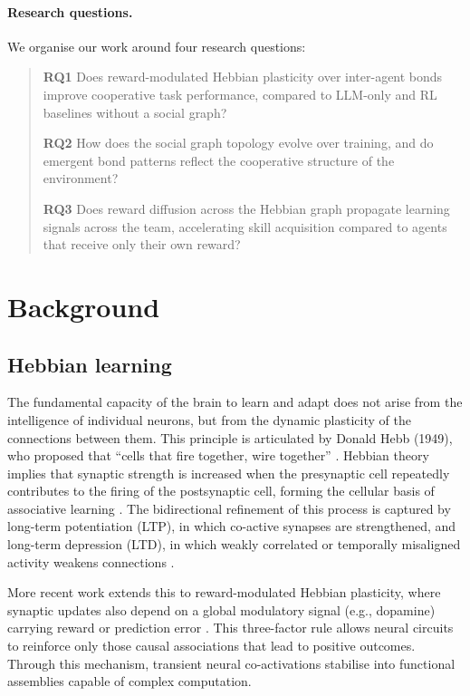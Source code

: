 \documentclass{article}
\theoremstyle{plain}
\theoremstyle{definition}
\theoremstyle{remark}
\begin{document}
\paragraph{Research questions.} We organise our work around four research questions:
\begin{quote}
\textbf{RQ1} Does reward-modulated Hebbian plasticity over inter-agent bonds improve cooperative task performance, compared to LLM-only and RL baselines without a social graph?

\textbf{RQ2} How does the social graph topology evolve over training, and do emergent bond patterns reflect the cooperative structure of the environment?

\textbf{RQ3} Does reward diffusion across the Hebbian graph propagate learning signals across the team, accelerating skill acquisition compared to agents that receive only their own reward?
\end{quote}

\section{Background}
\label{background}

\subsection*{Hebbian learning}
The fundamental capacity of the brain to learn and adapt does not arise from the intelligence of individual neurons, but from the dynamic plasticity of the connections between them. This principle is articulated by Donald Hebb (1949), who proposed that ``cells that fire together, wire together'' \cite{hebb2005organization}. Hebbian theory implies that synaptic strength is increased when the presynaptic cell repeatedly contributes to the firing of the postsynaptic cell, forming the cellular basis of associative learning \cite{brown2020donald, lazari2022hebbian}. The bidirectional refinement of this process is captured by long-term potentiation (LTP), in which co-active synapses are strengthened, and long-term depression (LTD), in which weakly correlated or temporally misaligned activity weakens connections \cite{lazari2022hebbian}.

More recent work extends this to reward-modulated Hebbian plasticity, where synaptic updates also depend on a global modulatory signal (e.g., dopamine) carrying reward or prediction error \cite{kusmierz2017learning}. This three-factor rule allows neural circuits to reinforce only those causal associations that lead to positive outcomes. Through this mechanism, transient neural co-activations stabilise into functional assemblies capable of complex computation.
\end{document}
